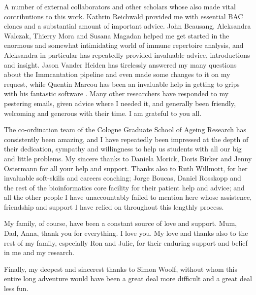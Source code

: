{A number of external collaborators and other scholars whose also made vital contributions to this work. Kathrin Reichwald provided me with essential BAC clones and a substantial amount of important advice. John Beausang, Aleksandra Walczak, Thierry Mora and Susana Magadan helped me get started in the enormous and somewhat intimidating world of immune repertoire analysis, and Aleksandra in particular has repeatedly provided invaluable advice, introductions and insight. Jason Vander Heiden has tirelessly answered my many questions about the Immcantation pipeline and even made some changes to it on my request, while Quentin Marcou has been an invaluable help in getting to grips with his fantastic software . Many other researchers have responded to my pestering emails, given advice where I needed it, and generally been friendly, welcoming and generous with their time. I am grateful to you all.

The co-ordination team of the Cologne Graduate School of Ageing Research has consistently been amazing, and I have repeatedly been impressed at the depth of their dedication, sympathy and willingness to help us students with all our big and little problems. My sincere thanks to Daniela Morick, Doris Birker and Jenny Ostermann for all your help and support. Thanks also to Ruth Willmott, for her invaluable soft-skills and careers coaching; Jorge Boucas, Daniel Rosskopp and the rest of the bioinformatics core facility for their patient help and advice; and all the other people I have unaccountably failed to mention here whose assistence, friendship and support I have relied on throughout this lengthly process.

My family, of course, have been a constant source of love and support. Mum, Dad, Anna, thank you for everything. I love you. My love and thanks also to the rest of my family, especially Ron and Julie, for their enduring support and belief in me and my research. 

Finally, my deepest and sincerest thanks to Simon Woolf, without whom this entire long adventure would have been a great deal more difficult and a great deal less fun.
}
